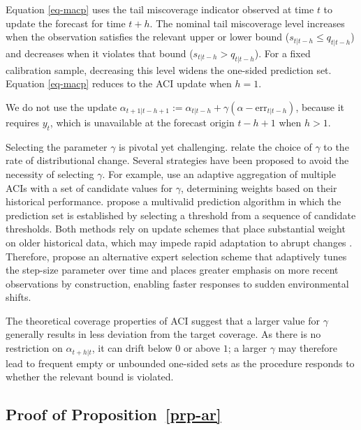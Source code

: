 \documentclass[
  american,
  12pt]{article}
\theoremstyle{plain}
\theoremstyle{plain}
\theoremstyle{remark}
\begin{document}
Equation \eqref{eq-macp} uses the tail miscoverage indicator observed at
time \(t\) to update the forecast for time \(t+h\). The nominal tail
miscoverage level increases when the observation satisfies the relevant
upper or lower bound (\(s_{t|t-h}\leq q_{t|t-h}\)) and decreases when it
violates that bound (\(s_{t|t-h}>q_{t|t-h}\)). For a fixed calibration
sample, decreasing this level widens the one-sided prediction set.
Equation \eqref{eq-macp} reduces to the ACI update when \(h=1\).

We do not use the update
\(\alpha_{t+1|t-h+1} := \alpha_{t|t-h} + \gamma(\alpha - \mathrm{err}_{t|t-h})\),
because it requires \(y_t\), which is unavailable at the forecast origin
\(t-h+1\) when \(h>1\).

Selecting the parameter \(\gamma\) is pivotal yet challenging.
\citet{gibbs2021} relate the choice of \(\gamma\) to the rate of
distributional change. Several strategies have been proposed to avoid
the necessity of selecting \(\gamma\). For example, \citet{zaffran2022}
use an adaptive aggregation of multiple ACIs with a set of candidate
values for \(\gamma\), determining weights based on their historical
performance. \citet{bastani2022} propose a multivalid prediction
algorithm in which the prediction set is established by selecting a
threshold from a sequence of candidate thresholds. Both methods rely on
update schemes that place substantial weight on older historical data,
which may impede rapid adaptation to abrupt changes \citep{gibbs2024}.
Therefore, \citet{gibbs2024} propose an alternative expert selection
scheme that adaptively tunes the step-size parameter over time and
places greater emphasis on more recent observations by construction,
enabling faster responses to sudden environmental shifts.

The theoretical coverage properties of ACI suggest that a larger value
for \(\gamma\) generally results in less deviation from the target
coverage. As there is no restriction on \(\alpha_{t+h|t}\), it can drift
below \(0\) or above \(1\); a larger \(\gamma\) may therefore lead to
frequent empty or unbounded one-sided sets as the procedure responds to
whether the relevant bound is violated.

\subsection{\texorpdfstring{Proof of
Proposition~\ref{prp-ar}}{Proof of Proposition~}}\label{sec-proof_ar}
\end{document}
